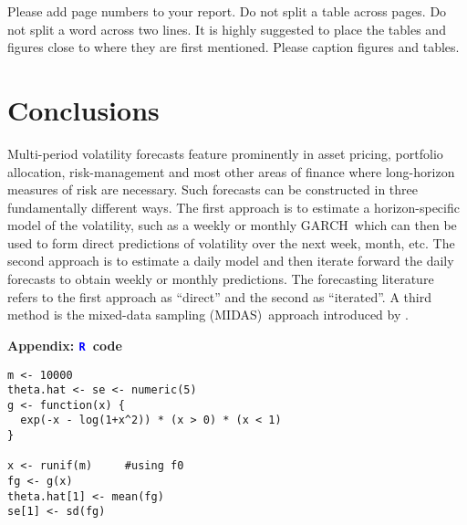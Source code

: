 \documentclass[12pt]{article}
\newcommand{\textR}[1]{\textcolor{blue}{\texttt{#1}}}
\newcommand{\R}{\textR{R}}
\begin{document}
Please add page numbers to your report. Do not split a table across pages. Do not split a word across two lines. It is highly suggested to place the tables and figures close to where they are first mentioned. Please caption figures and tables.

\section{Conclusions}


Multi-period volatility forecasts feature prominently in asset pricing, portfolio allocation, risk-management and most other areas of finance where long-horizon measures of risk are necessary. Such forecasts can be constructed in three fundamentally different ways. The first approach is to estimate a horizon-specific model of the volatility, such as a weekly or monthly GARCH\, which can then be used to form direct predictions of volatility over the next week, month, etc. The second approach is to estimate a daily model and then iterate forward the daily forecasts to obtain weekly or monthly predictions. The forecasting literature refers to the first approach as ``direct'' and the second as ``iterated''. A third method is the mixed-data sampling (MIDAS)\ approach introduced by \cite{ghysels_etal_midas-jfe}. 


\newpage






\newpage

\appendix
\begin{center}
{\Large {\bf Appendix: \R\ code}}
\end{center}

{\footnotesize \begin{verbatim}
m <- 10000 
theta.hat <- se <- numeric(5)
g <- function(x) {
  exp(-x - log(1+x^2)) * (x > 0) * (x < 1)
}

x <- runif(m)     #using f0
fg <- g(x)
theta.hat[1] <- mean(fg)
se[1] <- sd(fg)
\end{verbatim} }
\end{document}

